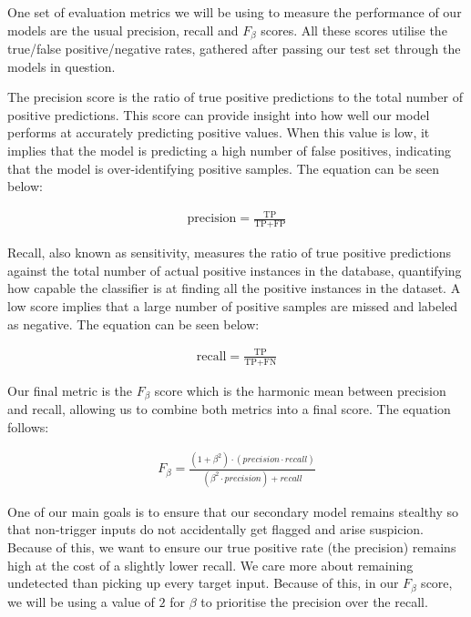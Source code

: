 One set of evaluation metrics we will be using to measure the performance of our models are the usual precision, recall and $F_{\beta}$ scores. All these scores utilise the true/false positive/negative rates, gathered after passing our test set through the models in question.

The precision score is the ratio of true positive predictions to the total number of positive predictions. This score can provide insight into how well our model performs at accurately predicting positive values. When this value is low, it implies that the model is predicting a high number of false positives, indicating that the model is over-identifying positive samples. The equation can be seen below:

\begin{equation}
    \begin{gathered}
        \text{precision} = \frac{\text{TP}}{\text{TP} + \text{FP}}
    \end{gathered}
    \label{eq:precision}
\end{equation}

Recall, also known as sensitivity, measures the ratio of true positive predictions against the total number of actual positive instances in the database, quantifying how capable the classifier is at finding all the positive instances in the dataset. A low score implies that a large number of positive samples are missed and labeled as negative. The equation can be seen below:

\begin{equation}
    \begin{gathered}
        \text{recall} = \frac{\text{TP}}{\text{TP} + \text{FN}}
    \end{gathered}
    \label{eq:recall}
\end{equation}

Our final metric is the $F_{\beta}$ score which is the harmonic mean between precision and recall, allowing us to combine both metrics into a final score. The equation follows:

\begin{equation}
    \begin{gathered}
        F_{\beta} = \frac{{(1 + \beta^2) \cdot (precision \cdot recall)}}{{(\beta^2 \cdot precision) + recall}}
    \end{gathered}
    \label{eq:f_beta}
\end{equation}

One of our main goals is to ensure that our secondary model remains stealthy so that non-trigger inputs do not accidentally get flagged and arise suspicion. Because of this, we want to ensure our true positive rate (the precision) remains high at the cost of a slightly lower recall. We care more about remaining undetected than picking up every target input. Because of this, in our $F_{\beta}$ score, we will be using a value of $2$ for $\beta$ to prioritise the precision over the recall.

